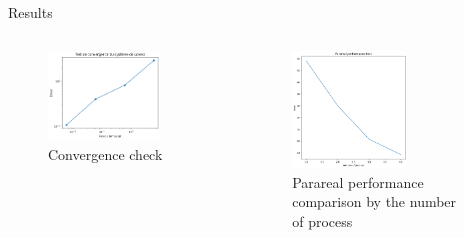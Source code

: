 \documentclass[aspectratio=169,xcolor=dvipsnames, t]{beamer}
\begin{document}
\begin{frame}{Results}
    \begin{columns}
\begin{column}{0.5\textwidth}
   \begin{figure}[ht!]
    \centering
    \includegraphics[width=0.78\textwidth]{figures/cv.png}
    \caption{Convergence check}
    \label{fig:5}
\end{figure}
\end{column}
\begin{column}{0.5\textwidth}  %
    \begin{center}
     \begin{figure}[ht!]
    \centering
    \includegraphics[width=0.64\textwidth]{figures/par.png}
    \caption{Parareal performance comparison by the number of process}
    \label{fig:6}
\end{figure}
     \end{center}
\end{column}
\end{columns}
\end{frame}
\end{document}
